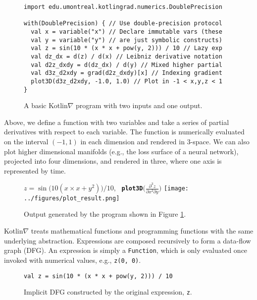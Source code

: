 \documentclass{article}
\begin{document}
\squeezeup\begin{figure}[!htb]
\begin{lstlisting}
import edu.umontreal.kotlingrad.numerics.DoublePrecision

with(DoublePrecision) { // Use double-precision protocol
  val x = variable("x") // Declare immutable vars (these
  val y = variable("y") // are just symbolic constructs)
  val z = sin(10 * (x * x + pow(y, 2))) / 10 // Lazy exp
  val dz_dx = d(z) / d(x) // Leibniz derivative notation
  val d2z_dxdy = d(dz_dx) / d(y) // Mixed higher partial
  val d3z_d2xdy = grad(d2z_dxdy)[x] // Indexing gradient
  plot3D(d3z_d2xdy, -1.0, 1.0) // Plot in -1 < x,y,z < 1
}
\end{lstlisting}
\squeezeup\squeezeup
\caption{A basic Kotlin$\nabla$ program with two inputs and one output.}
\label{label:fig1}
\end{figure}

\squeezeup Above, we define a function with two variables and take a series of partial derivatives with respect to each variable. The function is numerically evaluated on the interval $(-1, 1)$ in each dimension and rendered in 3-space. We can also plot higher dimensional manifolds (e.g., the loss surface of a neural network), projected into four dimensions, and rendered in three, where one axis is represented by time.

\squeezeup\begin{figure}[!htb]
\centering $z = \sin{\big(10(x \times x + y^2)\big)} / 10$, \textbf{\texttt{ plot3D}}$\Big(\frac{\partial^3z}{\partial{x^2}\partial{y}}\Big)$
\texttt{[image: ../figures/plot\_result.png]}
\squeezeup\caption{Output generated by the program shown in Figure \ref{label:fig1}.}\squeezeup
\end{figure}

Kotlin$\nabla$ treats mathematical functions and programming functions with the same underlying abstraction. Expressions are composed recursively to form a data-flow graph (DFG). An expression is simply a \texttt{Function}, which is only evaluated once invoked with numerical values, e.g., \texttt{z(0, 0)}.

\squeezeup\begin{figure}[!htb]
\centering
\begin{lstlisting}[basicstyle=\ttfamily\small]
 val z = sin(10 * (x * x + pow(y, 2))) / 10
\end{lstlisting}
\squeezeup\centering
{}
\squeezeup\squeezeup\squeezeup\caption{Implicit DFG constructed by the original expression, \texttt{z}.}
\end{figure}
\end{document}
